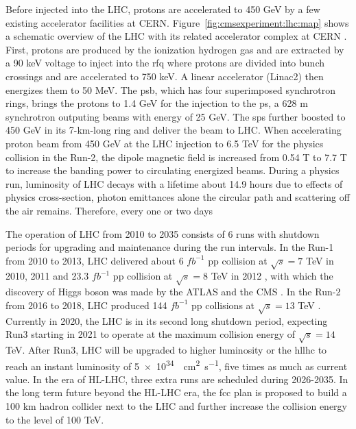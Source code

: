Before injected into the LHC, protons are accelerated to 450 GeV by a few existing accelerator facilities at CERN. Figure~\ref{fig:cmsexperiment:lhc:map} shows a schematic overview of the LHC with its related accelerator complex at CERN \cite{exhep:lhcInject:Benedikt:2004wm}. First, protons are produced by the ionization hydrogen gas and are extracted by a 90 keV voltage to inject into the \acrfull{rfq} where protons are divided into bunch crossings and are accelerated to 750 keV. A linear accelerator (Linac2) then energizes them to 50 MeV. The \acrfull{psb}, which has four superimposed synchrotron rings, brings the protons to 1.4 GeV for the injection to the \acrfull{ps}, a 628 \si{\m} synchrotron outputing beams with energy of 25 GeV. The \acrfull{sps} further boosted to 450 GeV in its 7-\si{km}-long ring and deliver the beam to LHC. When accelerating proton beam from 450 GeV at the LHC injection to 6.5 TeV for the physics collision in the Run-2, the dipole magnetic field is increased from 0.54 \si{\tesla} to 7.7 \si{\tesla} to increase the banding power to circulating energized beams. During a physics run, luminosity of LHC decays with a lifetime about 14.9 hours \cite{exhep:lhc:Evans:2008zzb} due to effects of physics cross-section, photon emittances alone the circular path and scattering off the air remains. Therefore, every one or two days



The operation of LHC from 2010 to 2035 consists of 6 runs with shutdown periods for upgrading and maintenance during the run intervals. In the Run-1 from 2010 to 2013, LHC delivered about 6 $fb^{-1}$ pp collision at $\sqrt{s}=7$ TeV in 2010, 2011 and 23.3 $fb^{-1}$ pp collision at $\sqrt{s}=8$ TeV in 2012 \cite{cms:publicLumiInfo}, with which the discovery of Higgs boson was made by the ATLAS \cite{exhep:atlasHiggsDisc:Aad:2012tfa} and the CMS \cite{exhep:cmsHiggsDisc:Chatrchyan:2012ufa}. In the Run-2 from 2016 to 2018, LHC produced 144 $fb^{-1}$ pp collisions at $\sqrt{s}=13$ TeV \cite{cms:publicLumiInfo}. Currently in 2020, the LHC is in its second long shutdown period, expecting Run3 starting in 2021 to operate at the maximum collision energy of $\sqrt{s}=14$ TeV. After Run3, LHC will be upgraded to higher luminosity or the \acrfull{hllhc} to reach an instant luminosity of \SI{5e34}{\per\cm\squared \per\s}, five times as much as current value. In the era of HL-LHC, three extra runs are scheduled during 2026-2035. In the long term future beyond the HL-LHC era, the \acrfull{fcc} \cite{exhep:fcc:Benedikt:2715354} plan is proposed to build a 100 km hadron collider next to the LHC and further increase the collision energy to the level of 100 TeV.